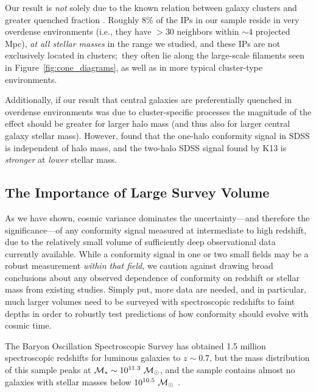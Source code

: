 {Our result is \emph{not} solely due to the known relation between galaxy clusters and greater quenched fraction \citep[e.g.,][]{Cooper07}.
Roughly 8\% of the IPs in our sample reside in very overdense environments (i.e., they have $>30$ neighbors within $\sim4$ projected Mpc),
\emph{at all stellar masses} in the range we studied, and these IPs are not exclusively located in clusters;~they often lie along the large-scale filaments seen in Figure~\ref{fig:cone_diagrams}, as well as in more typical cluster-type environments.

Additionally, if our result that central galaxies are preferentially quenched in overdense environments was due to cluster-specific processes the magnitude of the effect should be greater for larger halo mass (and thus also for larger central galaxy stellar mass).
However, \citet{Weinmann06} found that the one-halo conformity signal in SDSS is independent of halo mass, and the two-halo SDSS signal found by K13 is \emph{stronger} at \emph{lower} stellar mass.

\subsection{The Importance of Large Survey Volume}\label{sec:large_volume}

As we have shown, cosmic variance dominates the uncertainty---and therefore the significance---of any conformity signal measured at intermediate to high redshift, due to the relatively small volume of sufficiently deep observational data currently available.
While a conformity signal in one or two small fields may be a robust measurement \emph{within that field}, we caution against drawing broad conclusions about any observed dependence of conformity on redshift or stellar mass from existing studies.
Simply put, more data are needed, and in particular, much larger volumes need to be surveyed with spectroscopic redshifts to faint depths in order to robustly test predictions of how conformity should evolve with cosmic time.


The Baryon Oscillation Spectroscopic Survey \citep[BOSS;][]{Dawson13} has obtained 1.5 million spectroscopic redshifts for luminous galaxies to $z\sim0.7$, but the mass distribution of this sample peaks at ${\mstar\sim10^{11.3}~\msun}$, and the sample contains almost no galaxies with stellar masses below ${10^{10.5}~\msun}$ \citep{Maraston13}.

}
